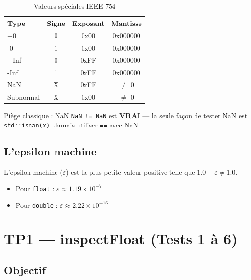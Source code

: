 \documentclass[12pt,a4paper]{report}
\begin{document}
\begin{table}[H]
    \centering
    \begin{tabular}{|l|c|c|c|}
        \hline
        \textbf{Type} & \textbf{Signe} & \textbf{Exposant} & \textbf{Mantisse} \\
        \hline
        +0       & 0 & 0x00 & 0x000000 \\
        -0       & 1 & 0x00 & 0x000000 \\
        +Inf     & 0 & 0xFF & 0x000000 \\
        -Inf     & 1 & 0xFF & 0x000000 \\
        NaN      & X & 0xFF & $\neq$ 0 \\
        Subnormal & X & 0x00 & $\neq$ 0 \\
        \hline
    \end{tabular}
    \caption{Valeurs spéciales IEEE 754}
\end{table}

\begin{warningbox}{Piège classique : NaN}
\texttt{NaN != NaN} est \textbf{VRAI} --- la seule façon de tester NaN
est \texttt{std::isnan(x)}. Jamais utiliser \texttt{==} avec NaN.
\end{warningbox}

\subsection{L'epsilon machine}

L'epsilon machine ($\varepsilon$) est la plus petite valeur positive telle
que $1.0 + \varepsilon \neq 1.0$.

\begin{itemize}
    \item Pour \texttt{float} : $\varepsilon \approx 1.19 \times 10^{-7}$
    \item Pour \texttt{double} : $\varepsilon \approx 2.22 \times 10^{-16}$
\end{itemize}

\section{TP1 --- inspectFloat (Tests 1 à 6)}

\subsection{Objectif}
\end{document}

